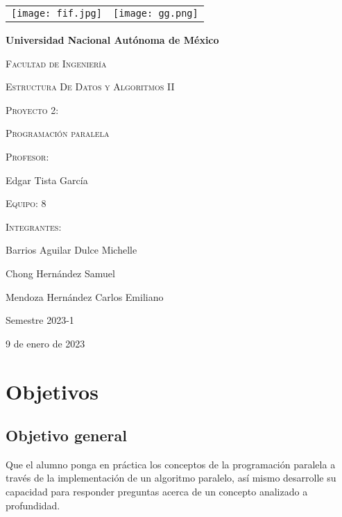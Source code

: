 \documentclass{article}
\begin{document}
\thispagestyle{empty}
\begin{titlepage}
\centering
\begin{center}
\begin{tabular}{c c}
\texttt{[image: fif.jpg]}\hspace{5cm}&\hspace{6cm}\texttt{[image: gg.png]}\\
\end{tabular}
\end{center}

{\bfseries\LARGE Universidad Nacional Autónoma de México \par}
\vspace{1cm}
{\scshape\Large Facultad de Ingeniería \par}
{\scshape\Large Estructura De Datos y Algoritmos II \par}
\vspace{2cm}
{\scshape\Large Proyecto 2: \par}
{\scshape\Large Programación paralela \par}
\vfill
{\scshape\Large Profesor: \par}
{\Large Edgar Tista García \par}
\vfill
{\scshape\Large Equipo: 8 \par}
\vfill
{\scshape\Large Integrantes: \par}
{\Large Barrios Aguilar Dulce Michelle \par}
{\Large Chong Hernández Samuel \par}
{\Large Mendoza Hernández Carlos Emiliano \par}
\vfill
{\Large Semestre 2023-1\par}
\vfill
{\Large 9 de enero de 2023 \par}
\end{titlepage}
\newpage
\color{black}
\tableofcontents
\newpage 
\section{Objetivos}
\subsection{Objetivo general}
Que el alumno ponga en práctica los conceptos de la programación paralela a través de la implementación de un algoritmo paralelo, así mismo desarrolle su capacidad para responder 
preguntas acerca de un concepto analizado a profundidad.
\end{document}
